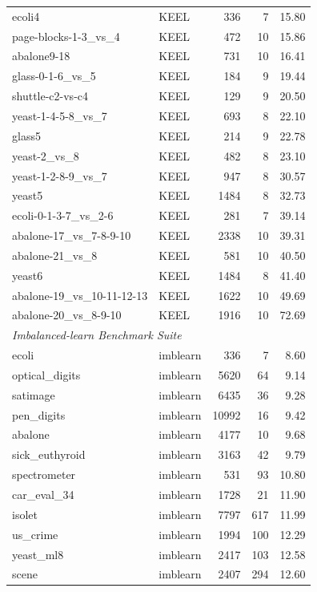 \begin{longtable}{llrrr}
    ecoli4 & KEEL & 336 & 7 & 15.80 \\
    page-blocks-1-3\_vs\_4 & KEEL & 472 & 10 & 15.86 \\
    abalone9-18 & KEEL & 731 & 10 & 16.41 \\
    glass-0-1-6\_vs\_5 & KEEL & 184 & 9 & 19.44 \\
    shuttle-c2-vs-c4 & KEEL & 129 & 9 & 20.50 \\
    yeast-1-4-5-8\_vs\_7 & KEEL & 693 & 8 & 22.10 \\
    glass5 & KEEL & 214 & 9 & 22.78 \\
    yeast-2\_vs\_8 & KEEL & 482 & 8 & 23.10 \\
    yeast-1-2-8-9\_vs\_7 & KEEL & 947 & 8 & 30.57 \\
    yeast5 & KEEL & 1484 & 8 & 32.73 \\
    ecoli-0-1-3-7\_vs\_2-6 & KEEL & 281 & 7 & 39.14 \\
    abalone-17\_vs\_7-8-9-10 & KEEL & 2338 & 10 & 39.31 \\
    abalone-21\_vs\_8 & KEEL & 581 & 10 & 40.50 \\
    yeast6 & KEEL & 1484 & 8 & 41.40 \\
    abalone-19\_vs\_10-11-12-13 & KEEL & 1622 & 10 & 49.69 \\
    abalone-20\_vs\_8-9-10 & KEEL & 1916 & 10 & 72.69 \\
\midrule
\multicolumn{5}{l}{\textit{Imbalanced-learn Benchmark Suite}} \\
\midrule
    ecoli & imblearn & 336 & 7 & 8.60 \\
    optical\_digits & imblearn & 5620 & 64 & 9.14 \\
    satimage & imblearn & 6435 & 36 & 9.28 \\
    pen\_digits & imblearn & 10992 & 16 & 9.42 \\
    abalone & imblearn & 4177 & 10 & 9.68 \\
    sick\_euthyroid & imblearn & 3163 & 42 & 9.79 \\
    spectrometer & imblearn & 531 & 93 & 10.80 \\
    car\_eval\_34 & imblearn & 1728 & 21 & 11.90 \\
    isolet & imblearn & 7797 & 617 & 11.99 \\
    us\_crime & imblearn & 1994 & 100 & 12.29 \\
    yeast\_ml8 & imblearn & 2417 & 103 & 12.58 \\
    scene & imblearn & 2407 & 294 & 12.60 \\

\end{longtable}
